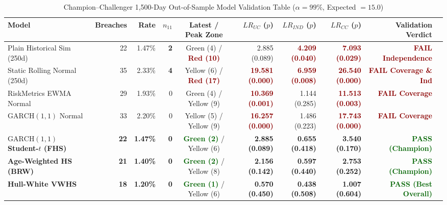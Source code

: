\documentclass[11pt,a4paper]{article}
\begin{document}
\begin{table}[H]
\centering
\caption{Champion--Challenger 1,500-Day Out-of-Sample Model Validation Table ($\alpha = 99\%$, Expected $= 15.0$)}
\scriptsize
\begin{tabular}{lrrrcrrrrl}
\toprule
\textbf{Model} & \textbf{Breaches} & \textbf{Rate} & \textbf{$n_{11}$} & \textbf{Latest / Peak Zone} & \textbf{$LR_{UC}$ ($p$)} & \textbf{$LR_{IND}$ ($p$)} & \textbf{$LR_{CC}$ ($p$)} & \textbf{Validation Verdict} \\
\midrule
Plain Historical Sim (250d) & 22 & 1.47\% & \textbf{2} & Green (4) / \textcolor{darkred}{\textbf{Red (10)}} & 2.885 (0.089) & \textcolor{darkred}{\textbf{4.209 (0.040)}} & \textcolor{darkred}{\textbf{7.093 (0.029)}} & \textcolor{darkred}{\textbf{FAIL Independence}} \\
Static Rolling Normal (250d) & 35 & 2.33\% & \textbf{4} & Yellow (6) / \textcolor{darkred}{\textbf{Red (17)}} & \textcolor{darkred}{\textbf{19.581 (0.000)}} & \textcolor{darkred}{\textbf{6.959 (0.008)}} & \textcolor{darkred}{\textbf{26.540 (0.000)}} & \textcolor{darkred}{\textbf{FAIL Coverage \& Ind}} \\
RiskMetrics EWMA Normal & 29 & 1.93\% & 0 & Green (4) / Yellow (9) & \textcolor{darkred}{\textbf{10.369 (0.001)}} & 1.144 (0.285) & \textcolor{darkred}{\textbf{11.513 (0.003)}} & \textcolor{darkred}{\textbf{FAIL Coverage}} \\
$\text{GARCH}(1,1)$ Normal & 33 & 2.20\% & 0 & Yellow (5) / Yellow (9) & \textcolor{darkred}{\textbf{16.257 (0.000)}} & 1.486 (0.223) & \textcolor{darkred}{\textbf{17.743 (0.000)}} & \textcolor{darkred}{\textbf{FAIL Coverage}} \\
\midrule
\textbf{$\text{GARCH}(1,1)$ Student-$t$ (FHS)} & \textbf{22} & \textbf{1.47\%} & \textbf{0} & \textcolor{darkgreen}{\textbf{Green (2)}} / Yellow (6) & \textbf{2.885 (0.089)} & \textbf{0.655 (0.418)} & \textbf{3.540 (0.170)} & \textcolor{darkgreen}{\textbf{PASS (Champion)}} \\
\textbf{Age-Weighted HS (BRW)} & \textbf{21} & \textbf{1.40\%} & \textbf{0} & \textcolor{darkgreen}{\textbf{Green (2)}} / Yellow (8) & \textbf{2.156 (0.142)} & \textbf{0.597 (0.440)} & \textbf{2.753 (0.252)} & \textcolor{darkgreen}{\textbf{PASS (Champion)}} \\
\textbf{Hull-White VWHS} & \textbf{18} & \textbf{1.20\%} & \textbf{0} & \textcolor{darkgreen}{\textbf{Green (1)}} / Yellow (6) & \textbf{0.570 (0.450)} & \textbf{0.438 (0.508)} & \textbf{1.007 (0.604)} & \textcolor{darkgreen}{\textbf{PASS (Best Overall)}} \\
\bottomrule
\end{tabular}
\end{table}
\end{document}
